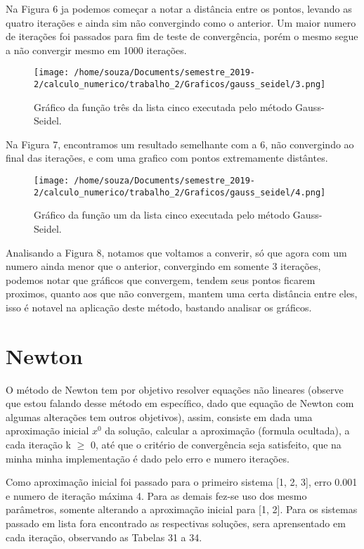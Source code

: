 \documentclass[12pt]{article}
\begin{document}
Na Figura 6 ja podemos começar a notar a distância entre os pontos, levando as quatro iterações e ainda sim não convergindo como o anterior. Um maior numero de iterações foi passados para fim de teste de convergência, porém o mesmo segue a não convergir mesmo em 1000 iterações.

\begin{figure}[!h]
    \centering
    \texttt{[image: /home/souza/Documents/semestre\_2019-2/calculo\_numerico/trabalho\_2/Graficos/gauss\_seidel/3.png]}
    \caption{Gráfico da função três da lista cinco executada pelo método Gauss-Seidel.}
\end{figure}

Na Figura 7, encontramos um resultado semelhante com a 6, não convergindo ao final das iterações, e com uma grafico com pontos extremamente distântes.

\begin{figure}[!h]
    \centering
    \texttt{[image: /home/souza/Documents/semestre\_2019-2/calculo\_numerico/trabalho\_2/Graficos/gauss\_seidel/4.png]}
    \caption{Gráfico da função um da lista cinco executada pelo método Gauss-Seidel.}
\end{figure}

Analisando a Figura 8, notamos que voltamos a converir, só que agora com um numero ainda menor que o anterior, convergindo em somente 3 iterações, podemos notar que gráficos que convergem, tendem seus pontos ficarem proximos, quanto aos que não convergem, mantem uma certa distância entre eles, isso é notavel na aplicação deste método, bastando analisar os gráficos.

\section{Newton}

O método de Newton tem por objetivo resolver equações não lineares (observe que estou falando desse método em específico, dado que equação de Newton com algumas alterações tem outros objetivos), assim, consiste em dada uma aproximação inicial $x^{0}$ da solução, calcular a aproximação (formula ocultada), a cada iteração k $\geq$ 0, até que o critério de convergência seja satisfeito, que na minha minha implementação é dado pelo erro e numero iterações.

Como aproximação inicial foi passado para o primeiro sistema [1, 2, 3], erro 0.001 e numero de iteração máxima 4. Para as demais fez-se uso dos mesmo parâmetros, somente alterando a aproximação inicial para [1, 2]. Para os sistemas passado em lista fora encontrado as respectivas soluções, sera aprensentado em cada iteração, observando as Tabelas 31 a 34.
\end{document}
